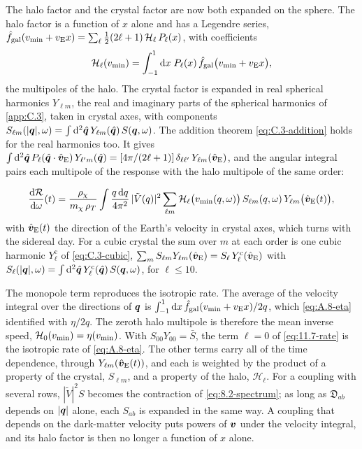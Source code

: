 The halo factor and the crystal factor are now both expanded on the sphere. The halo factor is a function of $x$ alone and has a Legendre series, $\hat f_{\mathrm{gal}}(v_{\mathrm{min}} + v_{\mathrm{E}}x) = \sum_\ell\tfrac12(2\ell + 1)\,\mathcal{H}_\ell\,P_\ell(x)$, with coefficients
\begin{equation}
  \mathcal{H}_\ell(v_{\mathrm{min}}) = \int_{-1}^{1}\mathrm{d} x\;P_\ell(x)\,\hat f_{\mathrm{gal}}\bigl(v_{\mathrm{min}} + v_{\mathrm{E}}x\bigr) ,
  \label{eq:11.7-ups}
\end{equation}
the multipoles of the halo. The crystal factor is expanded in real spherical harmonics $Y_{\ell m}$, the real and imaginary parts of the spherical harmonics of \cref{app:C.3}, taken in crystal axes, with components $S_{\ell m}(|\bm{q}|,\omega) = \int\mathrm{d}^2\hat{\bm{q}}\,Y_{\ell m}(\hat{\bm{q}})\,S(\bm{q},\omega)$. The addition theorem \cref{eq:C.3-addition} holds for the real harmonics too. It gives $\int\mathrm{d}^2\hat{\bm{q}}\,P_\ell(\hat{\bm{q}}\cdot\hat{\bm{v}}_{\mathrm{E}})\,Y_{\ell'm}(\hat{\bm{q}}) = [4\pi/(2\ell + 1)]\,\delta_{\ell\ell'}\,Y_{\ell m}(\hat{\bm{v}}_{\mathrm{E}})$, and the angular integral pairs each multipole of the response with the halo multipole of the same order:
\begin{keyresult}
\begin{equation}
  \frac{\mathrm{d}\mathcal{R}}{\mathrm{d}\omega}(t) = \frac{\rho_\chi}{m_{\chi}\,\rho_T}\int\frac{q\,\mathrm{d} q}{4\pi^2}\,|\tilde V(q)|^2\sum_{\ell m}\mathcal{H}_\ell\bigl(v_{\mathrm{min}}(q,\omega)\bigr)\,S_{\ell m}(q,\omega)\,Y_{\ell m}\bigl(\hat{\bm{v}}_{\mathrm{E}}(t)\bigr) ,
  \label{eq:11.7-rate}
\end{equation}
with $\hat{\bm{v}}_{\mathrm{E}}(t)$ the direction of the Earth's velocity in crystal axes, which turns with the sidereal day. For a cubic crystal the sum over $m$ at each order is one cubic harmonic $Y^{\mathrm{c}}_\ell$ of \cref{eq:C.3-cubic}, $\sum_mS_{\ell m}Y_{\ell m}(\hat{\bm{v}}_{\mathrm{E}}) = S_\ell\,Y^{\mathrm{c}}_\ell(\hat{\bm{v}}_{\mathrm{E}})$ with $S_\ell(|\bm{q}|,\omega) = \int\mathrm{d}^2\hat{\bm{q}}\,Y^{\mathrm{c}}_\ell(\hat{\bm{q}})\,S(\bm{q},\omega)$, for $\ell \le 10$.
\end{keyresult}
\noindent The monopole term reproduces the isotropic rate. The average of the velocity integral over the directions of $\bm{q}$ is $\int_{-1}^1\mathrm{d} x\,\hat f_{\mathrm{gal}}(v_{\mathrm{min}} + v_{\mathrm{E}}x)/2q$, which \cref{eq:A.8-eta} identified with $\eta/2q$. The zeroth halo multipole is therefore the mean inverse speed, $\mathcal{H}_0(v_{\mathrm{min}}) = \eta(v_{\mathrm{min}})$. With $S_{00}Y_{00} = \bar S$, the term $\ell = 0$ of \cref{eq:11.7-rate} is the isotropic rate of \cref{eq:A.8-eta}. The other terms carry all of the time dependence, through $Y_{\ell m}(\hat{\bm{v}}_{\mathrm{E}}(t))$, and each is weighted by the product of a property of the crystal, $S_{\ell m}$, and a property of the halo, $\mathcal{H}_\ell$. For a coupling with several rows, $|\tilde V|^2S$ becomes the contraction of \cref{eq:8.2-spectrum}; as long as $\mathfrak{D}_{ab}$ depends on $|\bm{q}|$ alone, each $S_{ab}$ is expanded in the same way. A coupling that depends on the dark-matter velocity puts powers of $\bm{v}$ under the velocity integral, and its halo factor is then no longer a function of $x$ alone.

